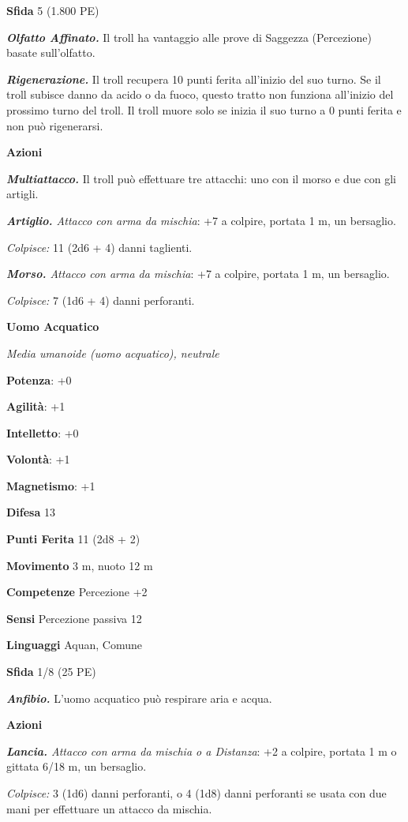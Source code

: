 \begin{multicols}{2}
\textbf{Sfida} 5 (1.800 PE)\smallskip

\emph{\textbf{Olfatto Affinato.}} Il troll ha vantaggio alle prove di
Saggezza (Percezione) basate sull'olfatto.

\emph{\textbf{Rigenerazione.}} Il troll recupera 10 punti ferita
all'inizio del suo turno. Se il troll subisce danno da acido o da fuoco,
questo tratto non funziona all'inizio del prossimo turno del troll. Il
troll muore solo se inizia il suo turno a 0 punti ferita e non può
rigenerarsi.

\smallskip\textbf{Azioni}

\emph{\textbf{Multiattacco.}} Il troll può effettuare tre attacchi: uno
con il morso e due con gli artigli.

\emph{\textbf{Artiglio.} Attacco con arma da mischia}: +7 a colpire,
portata 1 m, un bersaglio.

\emph{Colpisce:} 11 (2d6 + 4) danni taglienti.

\emph{\textbf{Morso.} Attacco con arma da mischia}: +7 a colpire,
portata 1 m, un bersaglio.

\emph{Colpisce:} 7 (1d6 + 4) danni perforanti.

\textbf{Uomo Acquatico}

\emph{Media umanoide (uomo acquatico), neutrale}

\textbf{Potenza}: +0

\textbf{Agilità}: +1

\textbf{Intelletto}: +0

\textbf{Volontà}: +1

\textbf{Magnetismo}: +1

\textbf{Difesa} 13

\textbf{Punti Ferita} 11 (2d8 + 2)

\textbf{Movimento} 3 m, nuoto 12 m

\textbf{Competenze} Percezione +2

\textbf{Sensi} Percezione passiva 12

\textbf{Linguaggi} Aquan, Comune

\textbf{Sfida} 1/8 (25 PE)\smallskip

\emph{\textbf{Anfibio.}} L'uomo acquatico può respirare aria e acqua.

\smallskip\textbf{Azioni}

\emph{\textbf{Lancia.} Attacco con arma da mischia o a Distanza}: +2 a
colpire, portata 1 m o gittata 6/18 m, un bersaglio.

\emph{Colpisce:} 3 (1d6) danni perforanti, o 4 (1d8) danni perforanti se
usata con due mani per effettuare un attacco da mischia.


\end{multicols}

